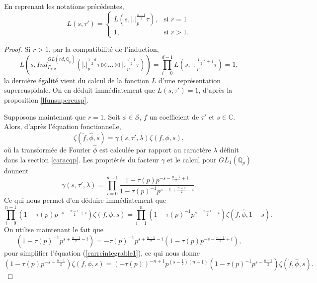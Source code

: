 \begin{proposition}
En reprenant les notations précédentes,
\begin{equation}
L(s, \tau') = \begin{cases}
    L(s,|.|_p^{\frac{n-1}{2}}\tau),& \text{si } r=1\\
    1,              & \text{si } r > 1.
\end{cases}
\end{equation}
\end{proposition}

\begin{proof}
Si $r > 1$, par la compatibilité de l'induction,
\begin{equation}
L(s, Ind_{P_{r,d}}^{GL(rd, \mathbb{Q}_p)}(|.|_p^{\frac{1-d}{2}}\tau \boxtimes ... \boxtimes |.|_p^{\frac{d-1}{2}}\tau)) = \prod_{i=0}^{d-1} L(s, |.|_p^{\frac{1-d}{2}+i}\tau)=1,
\end{equation}
la dernière égalité vient du calcul de la fonction $L$ d'une représentation supercuspidale. On en déduit immédiatement que $L(s,\tau')=1$, d'après la proposition \ref{lfunsupercusp}.

Supposons maintenant que $r=1$. Soit $\phi \in \mathcal{S}$, $f$ un coefficient de $\tau'$ et $s \in \mathbb{C}$. Alors, d'après l'équation fonctionnelle,
\begin{equation}
\zeta(\check{f}, \hat{\phi}, s) = \gamma(s, \tau', \lambda)\zeta(f, \phi, s),
\end{equation}
où la transformée de Fourier $\hat{\phi}$ est calculée par rapport au caractère $\lambda$ définit dans la section \ref{caracqp}.
Les propriétés du facteur $\gamma$ et le calcul pour $GL_1(\mathbb{Q}_p)$ donnent
\begin{equation}
\gamma(s, \tau', \lambda) = \prod_{i=0}^{n-1} \frac{1-\tau(p)p^{-s-\frac{n-1}{2}+i}}{1-\tau(p)^{-1}p^{s-1+\frac{n-1}{2}-i}}.
\end{equation}
Ce qui nous permet d'en déduire immédiatement que
\begin{equation}
\label{carreintegrable1}
\prod_{i=0}^{n-1}(1-\tau(p)p^{-s-\frac{n-1}{2}+i})\zeta(f, \phi, s) =
\prod_{i=1}^{n}(1-\tau(p)^{-1}p^{s+\frac{n-1}{2}-i})\zeta(\check{f}, \hat{\phi}, 1-s).
\end{equation}
On utilise maintenant le fait que
\begin{equation}
(1-\tau(p)^{-1}p^{s+\frac{n-1}{2}-i}) = -\tau(p)^{-1}p^{s+\frac{n-1}{2}-i}(1-\tau(p)p^{-s-\frac{n-1}{2}+i}),
\end{equation}
pour simplifier l'équation (\ref{carreintegrable1}), ce qui nous donne
\begin{equation}
\label{carreintegrable2}
(1-\tau(p)p^{-s-\frac{n-1}{2}})\zeta(f, \phi, s) = (-\tau(p))^{-n+1}
p^{(s-\frac{1}{2})(n-1)}(1-\tau(p)^{-1}p^{s-\frac{n-1}{2}})\zeta(\check{f}, \hat{\phi}, s).
\end{equation}


\end{proof}
